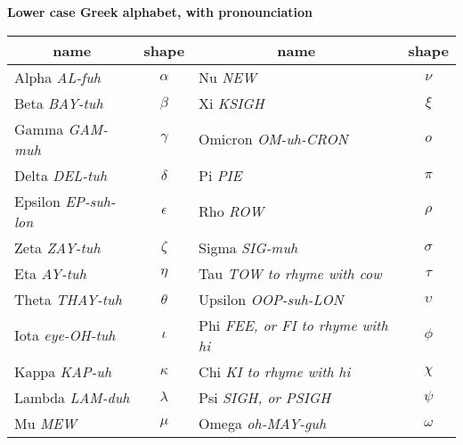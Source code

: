 \begin{center}
  \textbf{Lower case Greek alphabet, with pronounciation}
    \\[1ex]
  \newcommand{\pronounced}[1]{\hspace*{.2em}\small\textit{#1}}
  \begin{tabular}{lc@{\hspace*{3em}}lc}
    \multicolumn{1}{c}{name}    &shape      
    &\multicolumn{1}{c}{name}   &shape    \\ 
    \hline
     Alpha \pronounced{AL-fuh}  &\( \alpha  \)  
       &Nu  \pronounced{NEW}    &\( \nu     \)   \\
     Beta  \pronounced{BAY-tuh}   &\( \beta   \)  
       &Xi   \pronounced{KSIGH}   &\( \xi  \) \\ 
     Gamma  \pronounced{GAM-muh}  &\( \gamma  \)  
       &Omicron  \pronounced{OM-uh-CRON} &\( o       \) \\
     Delta  \pronounced{DEL-tuh}  &\( \delta  \)  
       &Pi  \pronounced{PIE}    &\( \pi \) \\
     Epsilon  \pronounced{EP-suh-lon} &\( \epsilon\)  
       &Rho  \pronounced{ROW}   &\( \rho \) \\
     Zeta   \pronounced{ZAY-tuh}  &\( \zeta   \)  
       &Sigma  \pronounced{SIG-muh} &\( \sigma  \) \\
     Eta  \pronounced{AY-tuh}    &\( \eta    \)  
       &Tau  \pronounced{TOW to rhyme with cow}   &\( \tau \) \\
     Theta  \pronounced{THAY-tuh}  &\( \theta  \)  
       &Upsilon  \pronounced{OOP-suh-LON} &\( \upsilon\) \\
     Iota \pronounced{eye-OH-tuh}  &\( \iota \) 
       &Phi  \pronounced{FEE, or FI to rhyme with hi}   &\( \phi    \) \\
     Kappa  \pronounced{KAP-uh} &\( \kappa  \) 
       &Chi  \pronounced{KI to rhyme with hi}   &\( \chi    \) \\
     Lambda  \pronounced{LAM-duh} &\( \lambda \) 
       &Psi \pronounced{SIGH, or PSIGH}   &\( \psi    \) \\
     Mu  \pronounced{MEW}    &\( \mu  \) 
       &Omega  \pronounced{oh-MAY-guh}  &\( \omega  \)
  \end{tabular}
\end{center}
\vfill
\par{}
%
